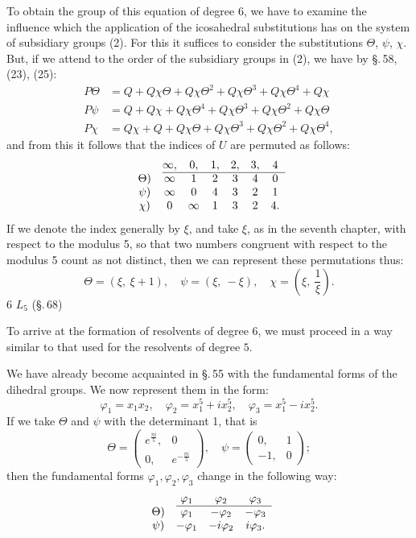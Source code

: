 To obtain the  group of this equation of degree $6$, we have to examine the influence which the application of the icosahedral substitutions has on the system of subsidiary groups (2). For this it suffices to consider the substitutions $\Theta$, $\psi$, $\chi$. But, if we attend to the order of the subsidiary groups in (2), we have by \S.\,58, (23), (25):
\[
\begin{aligned}
P\Theta &= Q + Q\chi\Theta + Q\chi\Theta^2 + Q\chi\Theta^3 + Q\chi\Theta^4 + Q\chi \\
P\psi &= Q + Q\chi + Q\chi\Theta^4 + Q\chi\Theta^3 + Q\chi\Theta^2 + Q\chi\Theta \\
P\chi &= Q\chi + Q + Q\chi\Theta + Q\chi\Theta^3 + Q\chi\Theta^2 + Q\chi\Theta^4,
\end{aligned}
\]
and from this it follows that the indices of $U$ are permuted as follows:
\[
\begin{array}{c@{\quad}cccccc}
 & \infty, & 0, & 1, & 2, & 3, & 4 \\
\cline{2-7}
\Theta) & \infty & 1 & 2 & 3 & 4 & 0 \\
\psi) & \infty & 0 & 4 & 3 & 2 & 1 \\
\chi) & 0 & \infty & 1 & 3 & 2 & 4.
\end{array}
\]
If we denote the index generally by $\xi$, and take $\xi$, as in the seventh chapter, with respect to the modulus 5, so that two numbers congruent with respect to the modulus 5 count as not distinct, then we can represent these permutations thus:
\[
\Theta = (\xi,\ \xi+1),\quad \psi = (\xi,\ -\xi),\quad \chi = \left(\xi,\ \frac{1}{\xi}\right)\!.
\]
 $6$  $L_5$ (\S.\,68)

To arrive at the formation of resolvents of degree $6$, we must proceed in a way similar to that used for the resolvents of degree $5$.

We have already become acquainted in \S.\,55 with the fundamental forms of the dihedral groups. We now represent them in the form:
\[
\varphi_1 = x_1x_2,\quad \varphi_2 = x_1^5+ix_2^5,\quad \varphi_3 = x_1^5-ix_2^5.
\]
If we take $\Theta$ and $\psi$ with the determinant 1, that is
\[
\Theta = \begin{pmatrix} e^{\frac{\pi i}{5}}, & 0 \\ 0, & e^{-\frac{\pi i}{5}} \end{pmatrix},\quad \psi = \begin{pmatrix} 0, & 1 \\ -1, & 0 \end{pmatrix};
\]
then the fundamental forms $\varphi_1, \varphi_2, \varphi_3$ change in the following way:
\[
\begin{array}{c@{\quad}ccc}
 & \varphi_1 & \varphi_2 & \varphi_3 \\
\cline{2-4}
\Theta) & \varphi_1 & -\varphi_2 & -\varphi_3 \\
\psi) & -\varphi_1 & -i\varphi_2 & i\varphi_3.
\end{array}
\]
